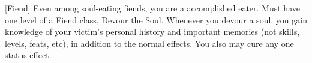  {[Fiend]}
\shortdescfeat
{Even among soul-eating fiends, you are a accomplished eater.}
{Must have one level of a Fiend class, Devour the Soul.}
{Whenever you devour a soul, you gain knowledge of your victim's personal history and important memories (not skills, levels, feats, etc), in addition to the normal effects. You also may cure any one status effect.}